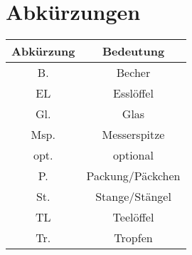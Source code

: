 \documentclass[a4paper,11pt,titlepage]{article}
\begin{document}
\section{Abkürzungen}
\begin{table}[!h]
\centering
\begin{tabular}{c|c}
\textbf{Abkürzung} & \textbf{Bedeutung}\\
\hline
B.                 & Becher\\
EL                 & Esslöffel\\
Gl.                & Glas\\
Msp.               & Messerspitze\\
opt.               & optional\\
P.                 & Packung/Päckchen\\
St.                & Stange/Stängel\\
TL                 & Teelöffel\\
Tr.                & Tropfen\\
\end{tabular}
\end{table}


\clearpage
{}
{}
\printindex
\end{document}
